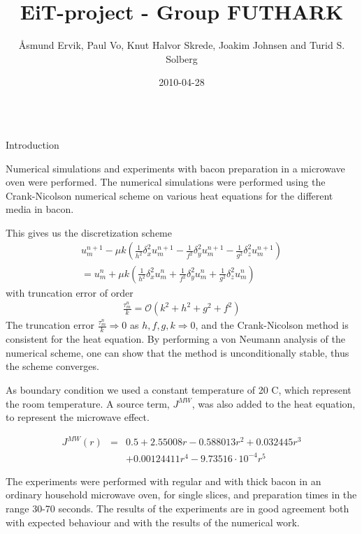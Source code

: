 \documentclass[final,hyperref={pdfpagelabels=false}]{beamer}
\title[NTNU-poster]{EiT-project - Group FUTHARK}
\author[Ervik et al.]{\AA smund Ervik, Paul Vo, Knut Halvor Skrede, Joakim Johnsen and Turid S. Solberg}
\institute[mia, NTNU]{MiA: Mathematics in Applications, Experts in Teamwork (Spring 2011), NTNU}
\date{2010-04-28}
\begin{document}
  \begin{frame}
  \begin{columns}[t]
  \begin{column}{1\textwidth}

	\justifying
    \begin{multicols}{2}
    
	{\Large Introduction}

	Numerical simulations and experiments with bacon preparation
	in a microwave oven were performed. The numerical simulations were
	performed using the Crank-Nicolson numerical scheme on various heat
	equations for the different media in bacon. 

\vspace{0.5\baselineskip}	
This gives us the discretization scheme
\begin{eqnarray*}
u_m^{n+1}-\mu k(\frac{1}{h^2}\delta_x^2 u_m^{n+1}-\frac{1}{f^2}\delta_y^2 u_m^{n+1}-\frac{1}{g^2}\delta_z^2 u_m^{n+1}) \\
=u_m^n + \mu k(\frac{1}{h^2}\delta_x^2 u_m^n + \frac{1}{f^2}\delta_y^2 u_m^n +\frac{1}{g^2}\delta_z^2 u_m^n)
\label{crank}
\end{eqnarray*}
with truncation error of order
\begin{eqnarray*}
\frac{\tau_m^ n}{k} = \mathcal{O} (k^2 + h^2 + g^2 + f^2)
\label{truncerror}
\end{eqnarray*}	
The truncation error $\frac{\tau_m^n}{k} \Rightarrow 0$ as $h,f,g,k \Rightarrow 0$, and the Crank-Nicolson method is consistent for the heat equation. By performing a von Neumann analysis of the numerical scheme, one can show that the method is unconditionally stable, thus the scheme converges.

\vspace{0.5\baselineskip}	
As boundary condition we used a constant temperature of 20 \textdegree C, which represent the room temperature. A source term, $J^{MW}$, was also added to the heat equation, to represent the microwave effect.

\begin{eqnarray*}
  J^{MW}(r) &=& 0.5 + 2.55008r - 0.588013r^2 + 0.032445r^3 \\
    && + 0.00124411r^4 - 9.73516\cdot 10^{-4}r^5
  \label{eq:effektfordeling}
\end{eqnarray*}

\vspace{1.0\baselineskip}
The experiments were
	performed with regular and with thick bacon in an ordinary household
	microwave oven, for single slices, and preparation times in the range
	30-70 seconds. The results of the experiments are in good agreement both
	with expected behaviour and with the results of the numerical work.
	

\end{multicols}
\end{column}
\end{columns}
\end{frame}
\end{document}
